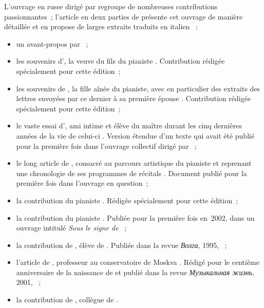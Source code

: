 L'ouvrage en russe dirigé par \citet{Nikonovich08} regroupe de nombreuses
contributions passionnantes~; l'article en deux parties de \VVoskobojnikov{}
présente cet ouvrage de manière détaillée et en propose de larges extraits
traduits en italien \citep[voir][]{Voskobojnikov09a, Voskobojnikov09b}~:
\begin{itemize}
 \item
 un avant-propos par \ASScriabine{} \citep{Scriabine08}~;
 \item
 les souvenirs d'\ISofronitskaya{}, la veuve du fils du pianiste
 \citep{Sofronitskaya08}.
 Contribution rédigée spécialement pour cette édition~;
 \item
 les souvenirs de \RKoganSofronitskaya{}, la fille aînée du pianiste, avec
 en particulier des extraits des lettres envoyées par ce dernier à sa
 première épouse \citep{Kogan08}.
 Contribution rédigée spécialement pour cette édition~;
 \item
 le vaste essai d'\INikonovich{}, ami intime et élève du maître durant les
 cinq dernières années de la vie de celui-ci \citep{Nikonovich08a}.
 Version étendue d'un texte qui avait été publié pour la première fois dans
 l'ouvrage collectif dirigé par \citet[p.~223-340]{Milshteyn70}~;
 \item
 le long article de \VNekrasova{}, consacré au parcours artistique du
 pianiste et reprenant une chronologie de ses programmes de récitals
 \citep{Nekrasova08}.
 Document publié pour la première fois dans l'ouvrage en question~;
 \item
 la contribution du pianiste \VMerzhanov{} \citep{Merzhanov08}.
 Rédigée spécialement pour cette édition~;
 \item
 la contribution du pianiste \LNaumov{} \citep{Naumov08}.
 Publiée pour la première fois en~2002, dans un ouvrage intitulé \emph{Sous
 le signe de \Neuhaus{}} \citep[p.~73-82]{Naumov02}~;
 \item
 la contribution de \SBenditsky{}, élève de \HNeuhaus{} \citep{Benditsky08}.
 Publiée dans la revue \emph{\foreignlanguage{russian}{Волга}}, 1995,
 ~;
 \item
 l'article de \VGornostaieva{}, professeur au conservatoire de Moskva
 \citep{Gornostaieva08}.
 Rédigé pour le centième anniversaire de la naissance de \VSofronitsky{} et
 publié dans la revue \emph{\foreignlanguage{russian}{Музыкальная жизнь}},
 2001,  \citep{Gornostaieva01}~;
 \item
 la contribution de \LSosina{}, collègue de \VGornostaieva{}
 \citep{Sosina08}.

\end{itemize}

